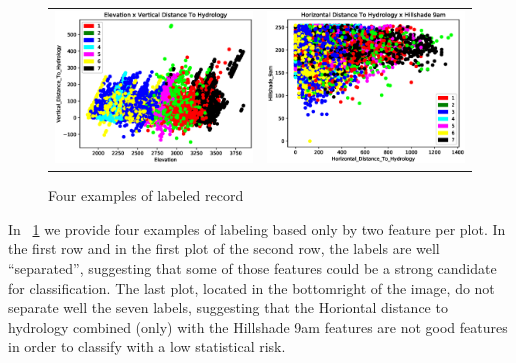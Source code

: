 \begin{figure}[htpb]
\begin{tabular}{cc}
		\includegraphics[scale=0.45]{figs/3.eps} & \includegraphics[scale=0.45]{figs/4.eps} \\ 
	\end{tabular} 
	\caption{Four examples of labeled record}
	\label{fig:plots}
\end{figure}
In \figurename~\ref{fig:plots} we provide four examples of labeling based only by two feature per plot. In the first row and in the first plot of the second row, the labels are well ``separated'', suggesting that some of those features could be a strong candidate for classification. The last plot, located in the bottom\-right of the image, do not separate well the seven labels, suggesting that the Horiontal distance to hydrology combined (only) with the Hillshade 9am features are not good features in order to classify with a low statistical risk.